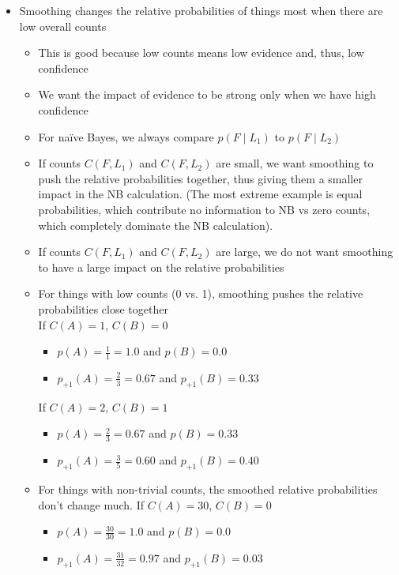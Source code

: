 \documentclass[11pt,letterpaper]{article}
\begin{document}
\begin{itemize}
  \item Smoothing changes the relative probabilities of things most when there are low overall counts
    \begin{itemize}
      \item This is good because low counts means low evidence and, thus, low confidence
      \item We want the impact of evidence to be strong only when we have high confidence
      \item For na\"{i}ve Bayes, we always compare $p(F \mid L_1)$ to $p(F \mid L_2)$
      \item If counts $C(F,L_1)$ and $C(F,L_2)$ are small, we want smoothing to push the relative probabilities together, thus giving them a smaller impact in the NB calculation.  (The most extreme example is equal probabilities, which contribute no information to NB vs zero counts, which completely dominate the NB calculation).
      \item If counts $C(F,L_1)$ and $C(F,L_2)$ are large, we do not want smoothing to have a large impact on the relative probabilities
      \\
      \item For things with low counts (0 vs. 1), smoothing pushes the relative probabilities close together \\
        If $C(A)=1$, $C(B)=0$
        \begin{itemize}
          \item $p(A)=\frac{1}{1} = \mathbf{1.0}$ and 
                $p(B) = \mathbf{0.0}$
          \item $p_{+1}(A)=\frac{2}{3} = \mathbf{0.67}$ and 
                $p_{+1}(B) = \mathbf{0.33}$
        \end{itemize}

        If $C(A)=2$, $C(B)=1$
        \begin{itemize}
          \item $p(A)=\frac{2}{3} = \mathbf{0.67}$ and 
                $p(B) = \mathbf{0.33}$
          \item $p_{+1}(A)=\frac{3}{5} = \mathbf{0.60}$ and 
                $p_{+1}(B) = \mathbf{0.40}$
        \end{itemize}

      \item For things with non-trivial counts, the smoothed relative probabilities don't change much. 
        If $C(A)=30$, $C(B)=0$
        \begin{itemize}
          \item $p(A)=\frac{30}{30} = \mathbf{1.0}$ and 
                $p(B) = \mathbf{0.0}$
          \item $p_{+1}(A)=\frac{31}{32} = \mathbf{0.97}$ and 
                $p_{+1}(B) = \mathbf{0.03}$
        \end{itemize}


\end{itemize}
\end{itemize}
\end{document}
